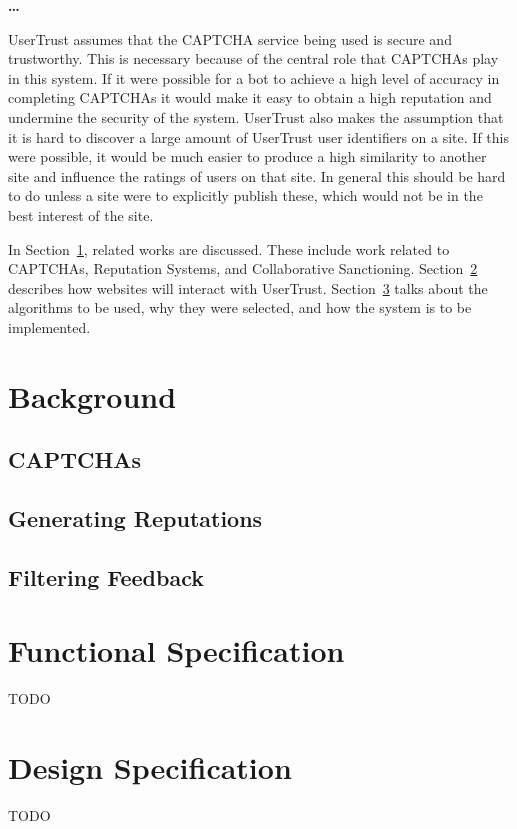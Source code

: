 \documentclass[journal, 12pt, onecolumn, draftclsnofoot]{IEEEtran}
\begin{document}
\textbf{\ldots}

UserTrust assumes that the CAPTCHA service being used is secure and trustworthy. This is necessary because of the central role that CAPTCHAs play in this system. If it were possible for a bot to achieve a high level of accuracy in completing CAPTCHAs it would make it easy to obtain a high reputation and undermine the security of the system. UserTrust also makes the assumption that it is hard to discover a large amount of UserTrust user identifiers on a site. If this were possible, it would be much easier to produce a high similarity to another site and influence the ratings of users on that site. In general this should be hard to do unless a site were to explicitly publish these, which would not be in the best interest of the site.

In Section~\ref{Background}, related works are discussed. These include work related to CAPTCHAs, Reputation Systems, and Collaborative Sanctioning. Section~\ref{Functional Specification} describes how websites will interact with UserTrust. Section~\ref{Design Specification} talks about the algorithms to be used, why they were selected, and how the system is to be implemented.

\section{Background}
\label{Background}

\subsection{CAPTCHAs}

\subsection{Generating Reputations}

\subsection{Filtering Feedback}

\section{Functional Specification}
\label{Functional Specification}
TODO

\section{Design Specification}
\label{Design Specification}
TODO
\end{document}
